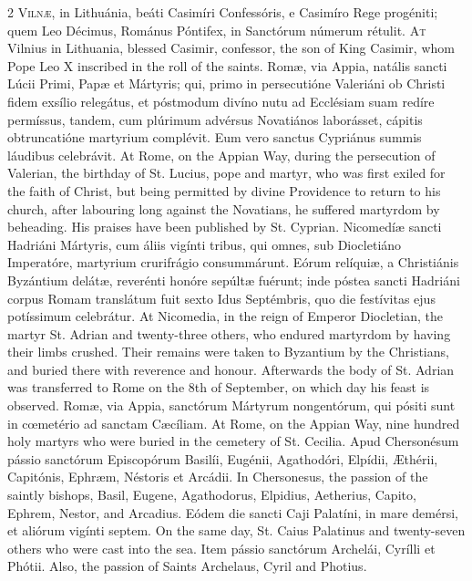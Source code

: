 \begin{paracol}{2}
\lettrine[lines=2]{V}{ilnæ,} in Lithuánia, beáti Casimíri Confessóris, 
 e Casimíro Rege progéniti; quem Leo Décimus, Románus Póntifex, in Sanctórum 
 númerum rétulit.
\switchcolumn
{}
\lettrine[lines=2]{A}{t} Vilnius in Lithuania, blessed Casimir, confessor, the son of King Casimir, 
 whom Pope Leo X inscribed in the roll of the saints.
\switchcolumn*
{}
Romæ, via Appia, natális sancti Lúcii Primi, 
 Papæ et Mártyris; qui, primo in persecutióne Valeriáni ob Christi fidem 
 exsílio relegátus, et póstmodum divíno nutu ad Ecclésiam suam redíre 
 permíssus, tandem, cum plúrimum advérsus Novatiános laborásset, cápitis 
 obtruncatióne martyrium complévit. Eum vero sanctus Cypriánus summis 
 láudibus celebrávit.
\switchcolumn
{}
At Rome, on the Appian Way, during the persecution of Valerian, the birthday 
 of St. Lucius, pope and martyr, who was first exiled for the faith of 
 Christ, but being permitted by divine Providence to return to his church, 
 after labouring long against the Novatians, he suffered martyrdom by 
 beheading. His praises have been published by St. Cyprian.
\switchcolumn*
{}
Nicomedíæ sancti Hadriáni Mártyris, cum áliis 
 vigínti tribus, qui omnes, sub Diocletiáno Imperatóre, martyrium crurifrágio 
 consummárunt. Eórum relíquiæ, a Christiánis Byzántium delátæ, 
 reverénti honóre sepúltæ fuérunt; inde póstea sancti Hadriáni corpus Romam 
 translátum fuit sexto Idus Septémbris, quo die festívitas ejus potíssimum 
 celebrátur.
\switchcolumn
{}
At Nicomedia, in the reign of Emperor Diocletian, the martyr St. Adrian and 
 twenty-three others, who endured martyrdom by having their limbs crushed. 
 Their remains were taken to Byzantium by the Christians, and buried there 
 with reverence and honour. Afterwards the body of St. Adrian was 
 transferred to Rome on the 8th of September, on which day his feast is 
 observed.
\switchcolumn*
{}
Romæ, via Appia, sanctórum Mártyrum nongentórum, 
 qui pósiti sunt in cœmetério ad sanctam Cæcíliam.
\switchcolumn
{}
At Rome, on the Appian Way, nine hundred holy martyrs who were buried in the 
 cemetery of St. Cecilia.
\switchcolumn*
{}
Apud Chersonésum pássio sanctórum Episcopórum Basilíi, 
 Eugénii, Agathodóri, Elpídii, Æthérii, Capitónis, Ephræm, Néstoris et 
 Arcádii.
\switchcolumn
{}
In Chersonesus, the passion of the saintly bishops, Basil, Eugene, 
 Agathodorus, Elpidius, Aetherius, Capito, Ephrem, Nestor, and Arcadius.
\switchcolumn*
{}
Eódem die sancti Caji Palatíni, in mare demérsi, et aliórum vigínti septem.
\switchcolumn
{}
On the same day, St. Caius Palatinus and twenty-seven others who were cast 
 into the sea.
\switchcolumn*
{}
Item pássio sanctórum Archelái, Cyrílli et Phótii.
\switchcolumn
{}
Also, the passion of Saints Archelaus, Cyril and Photius.
\switchcolumn*
{}
\end{paracol}


